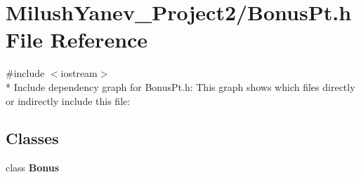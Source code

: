 \section{Milush\+Yanev\+\_\+\+Project2/\+Bonus\+Pt.h File Reference}
\label{_bonus_pt_8h}
{\ttfamily \#include $<$iostream$>$}\\*
Include dependency graph for Bonus\+Pt.\+h\+:
This graph shows which files directly or indirectly include this file\+:
\subsection*{Classes}
\begin{DoxyCompactItemize}
\item 
class {\bf Bonus}
\end{DoxyCompactItemize}
